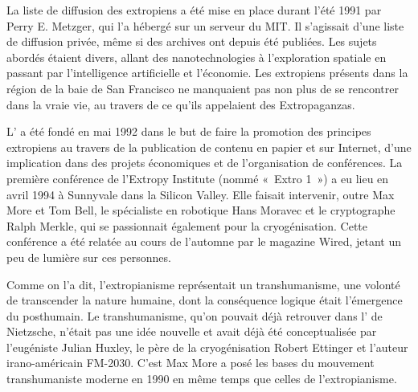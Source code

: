 La liste de diffusion des extropiens a été mise en place durant l'été 1991 par Perry E. Metzger, qui l'a hébergé sur un serveur du MIT. Il s'agissait d'une liste de diffusion privée, même si des archives ont depuis été publiées. Les sujets abordés étaient divers, allant des nanotechnologies à l'exploration spatiale en passant par l'intelligence artificielle et l'économie. Les extropiens présents dans la région de la baie de San Francisco ne manquaient pas non plus de se rencontrer dans la vraie vie, au travers de ce qu'ils appelaient des Extropaganzas.

L' a été fondé en mai 1992 dans le but de faire la promotion des principes extropiens au travers de la publication de contenu en papier et sur Internet, d'une implication dans des projets économiques et de l'organisation de conférences. La première conférence de l'Extropy Institute (nommé «~Extro 1~») a eu lieu en avril 1994 à Sunnyvale dans la Silicon Valley. Elle faisait intervenir, outre Max More et Tom Bell, le spécialiste en robotique Hans Moravec et le cryptographe Ralph Merkle, qui se passionnait également pour la cryogénisation. Cette conférence a été relatée au cours de l'automne par le magazine Wired, jetant un peu de lumière sur ces personnes.

Comme on l'a dit, l'extropianisme représentait un transhumanisme, une volonté de transcender la nature humaine, dont la conséquence logique était l'émergence du posthumain. Le transhumanisme, qu'on pouvait déjà retrouver dans l' de Nietzsche, n'était pas une idée nouvelle et avait déjà été conceptualisée par l'eugéniste Julian Huxley, le père de la cryogénisation Robert Ettinger et l'auteur irano-américain FM-2030. C'est Max More a posé les bases du mouvement transhumaniste moderne en 1990 en même temps que celles de l'extropianisme. %

